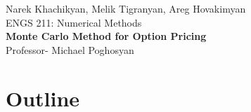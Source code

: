 \documentclass{article}
\begin{document}
\begin{titlepage}
\centering
\vspace*{\fill} 
{\Large Narek Khachikyan, Melik Tigranyan, Areg Hovakimyan}\\[0.5cm]
{\large ENGS 211: Numerical Methods}\\[0.5cm]
{\Large \textbf{Monte Carlo Method for Option Pricing}}\\[0.5cm]
{\large Professor- Michael Poghosyan}
\vspace*{\fill}
\end{titlepage}


\newpage
\tableofcontents 
\newpage



\section*{Outline} 
\end{document}
